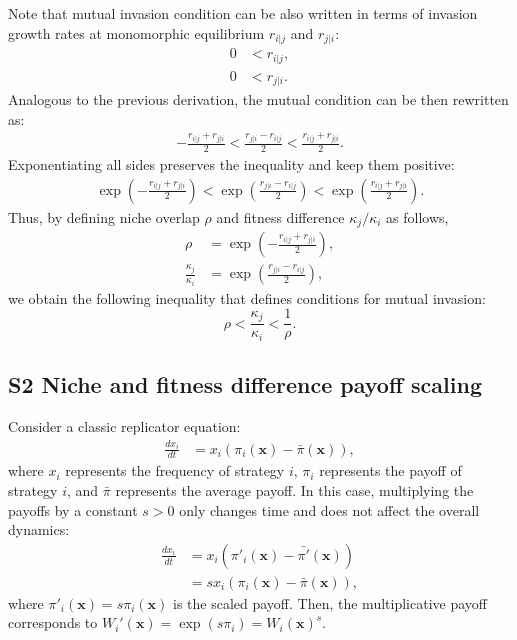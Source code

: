 \documentclass[12pt]{article}
\begin{document}
Note that mutual invasion condition can be also written in terms of invasion growth rates at monomorphic equilibrium $r_{i|j}$ and $r_{j|i}$:
\begin{align}
0 &< r_{i|j},\\
0 &< r_{j|i}.
\end{align}
Analogous to the previous derivation, the mutual condition can be then rewritten as:
\begin{align}
-\frac{r_{i|j}+r_{j|i}}{2} < \frac{r_{j|i}-r_{i|j}}{2} < \frac{r_{i|j} + r_{j|i}}{2}.
\end{align}
Exponentiating all sides preserves the inequality and keep them positive:
\begin{align}
\exp\left(-\frac{r_{i|j}+r_{j|i}}{2}\right) < \exp\left(\frac{r_{j|i}-r_{i|j}}{2}\right) < \exp\left(\frac{r_{i|j} + r_{j|i}}{2}\right).
\end{align}
Thus, by defining niche overlap $\rho$ and fitness difference $\kappa_j/\kappa_i$ as follows,
\begin{align}
\rho &= \exp\left(-\frac{r_{i|j}+r_{j|i}}{2}\right),\\
\frac{\kappa_j}{\kappa_i} &= \exp\left(\frac{r_{j|i}-r_{i|j}}{2}\right),
\end{align}
we obtain the following inequality that defines conditions for mutual invasion:
\begin{equation}
\rho < \frac{\kappa_j}{\kappa_i} < \frac{1}{\rho}.
\end{equation}

\subsection*{S2 Niche and fitness difference payoff scaling}

Consider a classic replicator equation:
\begin{align}
\frac{dx_i}{dt} &= x_i (\pi_i(\mathbf{x}) - \bar{\pi}(\mathbf{x})),
\end{align}
where $x_i$ represents the frequency of strategy $i$, $\pi_i$ represents the payoff of strategy $i$, and $\bar{\pi}$ represents the average payoff.
In this case, multiplying the payoffs by a constant $s > 0$ only changes time and does not affect the overall dynamics:
\begin{align}
\frac{dx_i}{dt} &= x_i (\pi'_i(\mathbf{x}) - \bar{\pi'}(\mathbf{x}))\\
&= s x_i (\pi_i(\mathbf{x}) - \bar{\pi}(\mathbf{x})),
\end{align}
where $\pi'_i(\mathbf{x}) = s \pi_i(\mathbf{x})$ is the scaled payoff.
Then, the multiplicative payoff corresponds to $W_i'(\mathbf{x}) = \exp(s\pi_i) = W_i(\mathbf{x})^s$.
\end{document}
